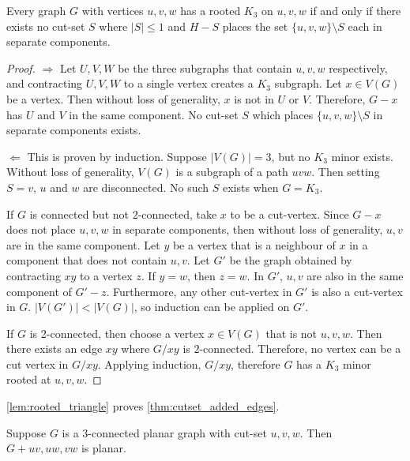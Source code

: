 \begin{lemma}\label{lem:rooted_triangle}
	Every graph $G$ with vertices $u, v, w$ has a rooted $K_3$ on $u, v, w$ if and only if there exists no cut-set $S$ where $|S| \leq 1$ and $H - S$ places the set $\{u,v,w\} \setminus S$ each in separate components. 
\end{lemma}
\begin{proof}
	$\Rightarrow$ Let $U,V,W$ be the three subgraphs that contain $u, v, w$ respectively, and contracting $U, V, W$ to a single vertex creates a $K_3$ subgraph. Let $x \in V(G)$ be a vertex. Then without loss of generality, $x$ is not in $U$ or $V$. Therefore, $G - x$ has $U$ and $V$ in the same component. No cut-set $S$ which places $\{u,v,w\} \setminus S$ in separate components exists. 

	$\Leftarrow$ This is proven by induction. Suppose $|V(G)| = 3$, but no $K_3$ minor exists. Without loss of generality, $V(G)$ is a subgraph of a path $uvw$. Then setting $S = v$, $u$ and $w$ are disconnected. No such $S$ exists when $G = K_3$. 

	If $G$ is connected but not $2$-connected, take $x$ to be a cut-vertex. Since $G - x$ does not place $u,v,w$ in separate components, then without loss of generality, $u,v$ are in the same component. Let $y$ be a vertex that is a neighbour of $x$ in a component that does not contain $u,v$. Let $G'$ be the graph obtained by contracting $xy$ to a vertex $z$. If $y = w$, then $z = w$. In $G'$, $u,v$ are also in the same component of $G' - z$. Furthermore, any other cut-vertex in $G'$ is also a cut-vertex in $G$. $|V(G')| < |V(G)|$, so induction can be applied on $G'$. 

	If $G$ is 2-connected, then choose a vertex $x \in V(G)$ that is not $u,v,w$. Then there exists an edge $xy$ where $G/xy$ is $2$-connected. Therefore, no vertex can be a cut vertex in $G/xy$. Applying induction, $G/xy$, therefore $G$ has a $K_3$ minor rooted at $u,v,w$.
\end{proof}


\cref{lem:rooted_triangle} proves \cref{thm:cutset_added_edges}. 

\begin{lemma}\label{thm:cutset_added_edges}
	Suppose $G$ is a $3$-connected planar graph with cut-set $u,v,w$. Then $G + uv, uw, vw$ is planar. 
\end{lemma}

